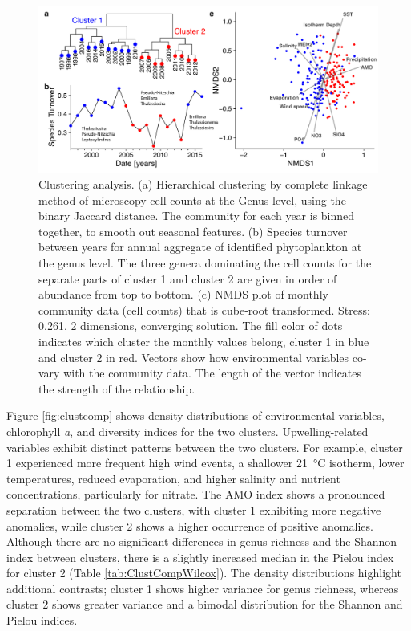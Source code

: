 \documentclass[draft]{agujournal2019}
\begin{document}
    \begin{figure}
    \noindent\includegraphics[width=\textwidth]{fig/Figure4_ClusteringNMDS_v2.pdf}
    \caption{Clustering analysis. (a) Hierarchical clustering by complete linkage method of microscopy cell counts at the Genus level, using the binary Jaccard distance. The community for each year is binned together, to smooth out seasonal features. (b) Species turnover between years for annual aggregate of identified phytoplankton at the genus level. The three genera dominating the cell counts for the separate parts of cluster 1 and cluster 2 are given in order of abundance from top to bottom. (c) NMDS plot of monthly community data (cell counts) that is cube-root transformed. Stress: 0.261, 2 dimensions, converging solution. The fill color of dots indicates which cluster the monthly values belong, cluster 1 in blue and cluster 2 in red. Vectors show how environmental variables co-vary with the community data. The length of the vector indicates the strength of the relationship.}
    \label{fig:clustering}
    \end{figure}
    
    Figure \ref{fig:clustcomp} shows density distributions of environmental variables, chlorophyll \textit{a}, and diversity indices for the two clusters. Upwelling-related variables exhibit distinct patterns between the two clusters. For example, cluster 1 experienced more frequent high wind events, a shallower \qty{21}{\celsius} isotherm, lower temperatures, reduced evaporation, and higher salinity and nutrient concentrations, particularly for nitrate. The AMO index shows a pronounced separation between the two clusters, with cluster 1 exhibiting more negative anomalies, while cluster 2 shows a higher occurrence of positive anomalies. Although there are no significant differences in genus richness and the Shannon index between clusters, there is a slightly increased median in the Pielou index for cluster 2 (Table \ref{tab:ClustCompWilcox}). The density distributions highlight additional contrasts; cluster 1 shows higher variance for genus richness, whereas cluster 2 shows greater variance and a bimodal distribution for the Shannon and Pielou indices. 
    
\end{document}

